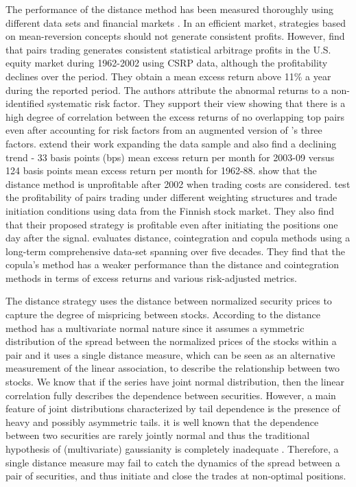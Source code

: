\documentclass[a4paper]{article}
\begin{document}
	The performance of the distance method has been measured thoroughly using different data sets and financial markets \citep{ggr06,p09,df10,df12,bv12,cm13,rf15}. In an efficient market, strategies based on mean-reversion concepts should not generate consistent profits. However, \citet*{ggr06} find that pairs trading generates consistent statistical arbitrage profits in the U.S. equity market during 1962-2002 using CSRP data, although the profitability declines over the period. They obtain a mean excess return above 11\% a year during the reported period. The authors attribute the abnormal returns to a non-identified systematic risk factor. They support their view showing that there is a high degree of correlation between the excess returns of no overlapping top pairs even after accounting for risk factors from an augmented version of \citet*{ff93}'s three factors. \citet*{df10} extend their work expanding the data sample and also find a declining trend - 33 basis points (bps) mean excess return per month for 2003-09 versus 124 basis points mean excess return per month for 1962-88. \citet*{df12} show that the distance method is unprofitable after 2002 when trading costs are considered. \citet*{bv12} test the profitability of pairs trading under different weighting structures and trade initiation conditions using data from the Finnish stock market. They also find that their proposed strategy is profitable even after initiating the positions one day after the signal. \citet*{rf15} evaluates distance, cointegration and copula methods using a long-term comprehensive data-set spanning over five decades. They find that the copula's method has a weaker performance than the distance and cointegration methods in terms of excess returns and various risk-adjusted metrics.
	
The distance strategy \citep{ggr06} uses the distance between normalized security prices to capture the degree of mispricing between stocks. According to \citet*{xie14} the distance method has a multivariate normal nature since it assumes a symmetric distribution of the spread between the normalized prices of the stocks within a pair and it uses a single distance measure, which can be seen as an alternative measurement of the linear association, to describe the relationship between two stocks. We know that if the series have joint normal distribution, then the linear correlation fully describes the dependence between securities. However, a main feature of joint distributions characterized by tail dependence is the presence of heavy and possibly asymmetric tails. it is well known that the dependence between two securities are rarely jointly normal and thus the traditional hypothesis of (multivariate) gaussianity is completely inadequate  \citep{campbell97,cont01,ane03,mcneil15}.  Therefore, a single distance measure may fail to catch the dynamics of the spread between a pair of securities, and thus initiate and close the trades at non-optimal positions.
	
\end{document}
